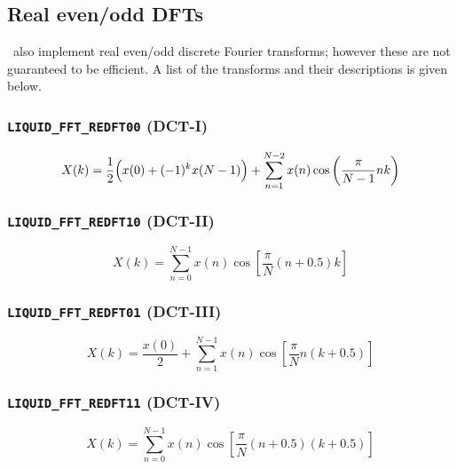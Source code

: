 \subsection{Real even/odd DFTs}
\label{module:fft:r2r}
%
\liquid\ also implement real even/odd discrete Fourier transforms;
however these are not guaranteed to be efficient.
A list of the transforms and their descriptions is given below.
%
\subsubsection{{\tt LIQUID\_FFT\_REDFT00} (DCT-I)}
\label{module:fft:r2r:REDFT00}
    \begin{equation}
    \label{eqn:fft:dct-I}
        X(k) = \frac{1}{2}\Bigl( x(0) + (-1)^k x(N-1) \Bigr) + 
               \sum_{n=1}^{N-2}{x(n) \cos\left(\frac{\pi}{N-1}nk\right) }
    \end{equation}

\subsubsection{{\tt LIQUID\_FFT\_REDFT10} (DCT-II)}
\label{module:fft:r2r:REDFT10}
    \begin{equation}
    \label{eqn:fft:dct-II}
        X(k) =  \sum_{n=0}^{N-1}{
                    x(n) \cos\left[
                        \frac{\pi}{N}\left(n + 0.5\right)k
                    \right]
                }
    \end{equation}

\subsubsection{{\tt LIQUID\_FFT\_REDFT01} (DCT-III)}
\label{module:fft:r2r:REDFT01}
    \begin{equation}
    \label{eqn:fft:dct-III}
        X(k) =  \frac{x(0)}{2} +
                \sum_{n=1}^{N-1}{
                    x(n) \cos\left[
                        \frac{\pi}{N}n\left(k + 0.5\right)
                    \right]
                }
    \end{equation}

\subsubsection{{\tt LIQUID\_FFT\_REDFT11} (DCT-IV)}
\label{module:fft:r2r:REDFT11}
    \begin{equation}
    \label{eqn:fft:dct-IV}
        X(k) =  \sum_{n=0}^{N-1}{
                    x(n) \cos\left[
                        \frac{\pi}{N}
                        \left(n+0.5\right)
                        \left(k+0.5\right)
                    \right]
                }
    \end{equation}

